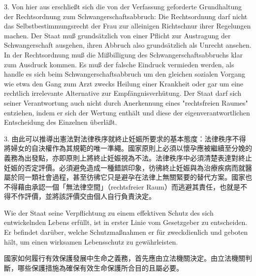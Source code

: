 \documentclass[12pt]{article}
\begin{document}
\syncleft
\begin{sourcepara}
3. Von hier aus erschließt sich die von der Verfassung geforderte Grundhaltung der Rechtsordnung zum Schwangerschaftsabbruch: Die Rechtsordnung darf nicht das Selbstbestimmungsrecht der Frau zur alleinigen Richtschnur ihrer Regelungen machen. Der Staat muß grundsätzlich von einer Pflicht zur Austragung der Schwangerschaft ausgehen, ihren Abbruch also grundsätzlich als Unrecht ansehen. In der Rechtsordnung muß die Mißbilligung des Schwangerschaftsabbruchs klar zum Ausdruck kommen. Es muß der falsche Eindruck vermieden werden, als handle es sich beim Schwangerschaftsabbruch um den gleichen sozialen Vorgang wie etwa den Gang zum Arzt zwecks Heilung einer Krankheit oder gar um eine rechtlich irrelevante Alternative zur Empfängnisverhütung. Der Staat darf sich seiner Verantwortung auch nicht durch Anerkennung eines "rechtsfreien Raumes" entziehen, indem er sich der Wertung enthält und diese der eigenverantwortlichen Entscheidung des Einzelnen überläßt.
\end{sourcepara}
\begin{transpara}
3. 由此可以推導出憲法對法律秩序就終止妊娠所要求的基本態度：法律秩序不得將婦女的自決權作為其規範的唯一準繩。國家原則上必須以懷孕應被繼續至分娩的義務為出發點，亦即原則上將終止妊娠視為不法。法律秩序中必須清楚表達對終止妊娠的否定評價。必須避免造成一種錯誤印象，彷彿終止妊娠與為治療疾病而就醫屬於同一類社會過程，甚至彷彿它只是避孕在法律上無關緊要的替代方案。國家也不得藉由承認一個「無法律空間」（rechtsfreier Raum）而逃避其責任，也就是不得不作評價，並將該評價交由個人自行負責決定。
\end{transpara}

\syncleft
\begin{sourcepara}
Wie der Staat seine Verpflichtung zu einem effektiven Schutz des sich entwickelnden Lebens erfüllt, ist in erster Linie vom Gesetzgeber zu entscheiden. Er befindet darüber, welche Schutzmaßnahmen er für zweckdienlich und geboten hält, um einen wirksamen Lebensschutz zu gewährleisten.
\end{sourcepara}
\begin{transpara}
國家如何履行有效保護發展中生命之義務，首先應由立法機關決定。由立法機關判斷，哪些保護措施為確保有效生命保護所合目的且屬必要。
\end{transpara}
\end{document}
